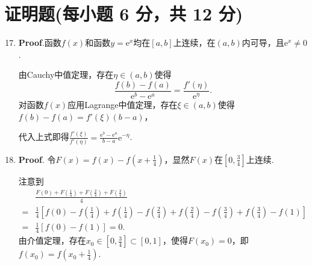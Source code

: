 \documentclass[../main.tex]{subfiles}
\begin{document}
\section{证明题(每小题 6 分，共 12 分)}
\begin{enumerate}
    \setcounter{enumi}{16}
    \item \textbf{Proof}.函数$f(x)$和函数$y=\mathrm{e}^{x}$均在$[a,b]$上连续，在$(
              a,b)$内可导，且$\mathrm{e}^{x}\neq0$.

          由Cauchy中值定理，存在$\eta\in(a,b)$使得
          \[
              \frac{f(b)-f(a)}{\mathrm{e}^{b}-\mathrm{e}^{a}}=\frac{f'(\eta)}{\mathrm{e}^{\eta}}
              .
          \]
          对函数$f(x)$应用Lagrange中值定理，存在$\xi\in(a,b)$使得$f(b)-f(a)=f'(\xi)(b
              -a)$，

          代入上式即得$\frac{f'(\xi)}{f'(\eta)}=\frac{\mathrm{e}^{b}-\mathrm{e}^{a}}{b-a}
              \mathrm{e}^{-\eta}$.

    \item \textbf{Proof}. 令$F(x)=f(x)-f\left(x+\frac{1}{4}\right)$，显然$F(
              x)$在$\left[0,\frac{3}{4}\right]$上连续.

          注意到
          \[
              \begin{aligned}
                       & \frac{F(0)+F\left(\frac{1}{4}\right)+F\left(\frac{2}{4}\right)+F\left(\frac{3}{4}\right)}{4}                                                                                                  \\
                  = {} & \frac{1}{4}\left[f(0)-f\left(\frac{1}{4}\right)+f\left(\frac{1}{4}\right)-f\left(\frac{2}{4}\right)+f\left(\frac{2}{4}\right)-f\left(\frac{3}{4}\right)+f\left(\frac{3}{4}\right)-f(1)\right] \\
                  = {} & \frac{1}{4}\left[f(0)-f(1)\right]=0.
              \end{aligned}
          \]
          由介值定理，存在$x_{0}\in\left[0,\frac{3}{4}\right]\subset[0,1]$，使得$F(x_{0}
              )=0$，即$f(x_{0})=f\left(x_{0}+\frac{1}{4}\right)$.
\end{enumerate}
\end{document}
